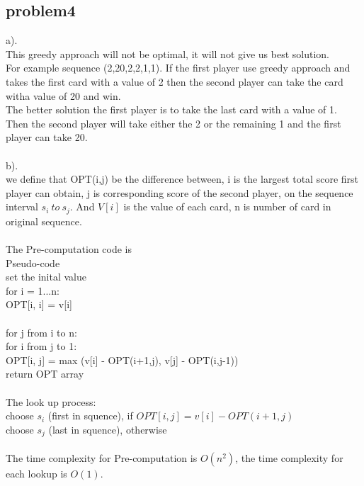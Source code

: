 \documentclass[11pt]{article}
\newcommand\tab[1][1cm]{\hspace*{#1}}
\begin{document}
\subsection{problem4}
a).\\
This greedy approach will not be optimal, it will not give us best solution.\\
For example sequence (2,20,2,2,1,1). If the first player use  greedy approach and takes the first card with a value of 2 then the second player can take the card witha value of 20 and win. \\
The better solution the first player is to take the last card with a value of 1. Then the second player will take either the 2 or the remaining 1 and the first player can take 20.\\
\\
b).\\
we define that OPT(i,j) be the difference between, i is the largest total score first player can obtain, j is corresponding score of the second player, on the sequence interval $s_i \ to \ s_j$. And $V[i]$ is the value of each card, n is number of card in original sequence.\\
\\
The Pre-computation code is \\
Pseudo-code\\
set the inital value\\
for i = 1...n:\\
\tab OPT[i, i] = v[i]\\
\\
for j from i to n:\\
\tab for i from j to 1:\\
\tab \tab OPT[i, j] = max (v[i] - OPT(i+1,j), v[j] - OPT(i,j-1))\\
return OPT array\\
\\
The look up process:\\
choose $s_i$ (first in squence), if $OPT[i,j]=v[i]-OPT(i+1,j)$\\
choose $s_j$ (last in squence), otherwise\\
\\
The time complexity for Pre-computation is $O(n^2)$, the time complexity for each lookup is $O(1)$.
\end{document}
